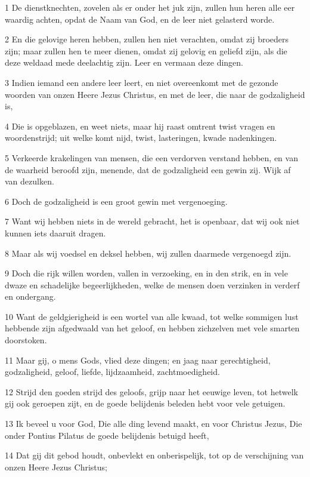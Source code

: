 \par 1 De dienstknechten, zovelen als er onder het juk zijn, zullen hun heren alle eer waardig achten, opdat de Naam van God, en de leer niet gelasterd worde.
\par 2 En die gelovige heren hebben, zullen hen niet verachten, omdat zij broeders zijn; maar zullen hen te meer dienen, omdat zij gelovig en geliefd zijn, als die deze weldaad mede deelachtig zijn. Leer en vermaan deze dingen.
\par 3 Indien iemand een andere leer leert, en niet overeenkomt met de gezonde woorden van onzen Heere Jezus Christus, en met de leer, die naar de godzaligheid is,
\par 4 Die is opgeblazen, en weet niets, maar hij raast omtrent twist vragen en woordenstrijd; uit welke komt nijd, twist, lasteringen, kwade nadenkingen.
\par 5 Verkeerde krakelingen van mensen, die een verdorven verstand hebben, en van de waarheid beroofd zijn, menende, dat de godzaligheid een gewin zij. Wijk af van dezulken.
\par 6 Doch de godzaligheid is een groot gewin met vergenoeging.
\par 7 Want wij hebben niets in de wereld gebracht, het is openbaar, dat wij ook niet kunnen iets daaruit dragen.
\par 8 Maar als wij voedsel en deksel hebben, wij zullen daarmede vergenoegd zijn.
\par 9 Doch die rijk willen worden, vallen in verzoeking, en in den strik, en in vele dwaze en schadelijke begeerlijkheden, welke de mensen doen verzinken in verderf en ondergang.
\par 10 Want de geldgierigheid is een wortel van alle kwaad, tot welke sommigen lust hebbende zijn afgedwaald van het geloof, en hebben zichzelven met vele smarten doorstoken.
\par 11 Maar gij, o mens Gods, vlied deze dingen; en jaag naar gerechtigheid, godzaligheid, geloof, liefde, lijdzaamheid, zachtmoedigheid.
\par 12 Strijd den goeden strijd des geloofs, grijp naar het eeuwige leven, tot hetwelk gij ook geroepen zijt, en de goede belijdenis beleden hebt voor vele getuigen.
\par 13 Ik beveel u voor God, Die alle ding levend maakt, en voor Christus Jezus, Die onder Pontius Pilatus de goede belijdenis betuigd heeft,
\par 14 Dat gij dit gebod houdt, onbevlekt en onberispelijk, tot op de verschijning van onzen Heere Jezus Christus;
